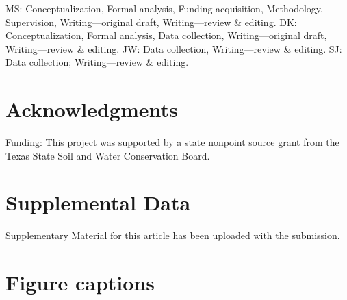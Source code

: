 \documentclass[utf8]{FrontiersinHarvard}
\begin{document}
MS: Conceptualization, Formal analysis, Funding acquisition, Methodology, Supervision, Writing---original draft, Writing---review \& editing.
DK: Conceptualization, Formal analysis, Data collection, Writing---original draft, Writing---review \& editing.
JW: Data collection, Writing---review \& editing.
SJ: Data collection; Writing---review \& editing.

\hypertarget{acknowledgments}{%
\section*{Acknowledgments}\label{acknowledgments}}

Funding: This project was supported by a state nonpoint source grant from the Texas State Soil and Water Conservation Board.

\hypertarget{supplemental-data}{%
\section*{Supplemental Data}\label{supplemental-data}}

Supplementary Material for this article has been uploaded with the submission.




\hypertarget{figure-captions}{%
\section*{Figure captions}\label{figure-captions}}
\end{document}
